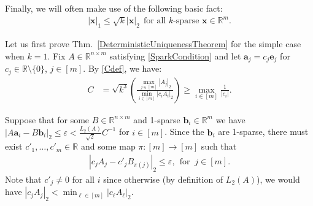 \documentclass[journal, twocolumn]{IEEEtran}
\begin{document}
Finally, we will often make use of the following basic fact:
\begin{align}\label{sqrtk}
|\mathbf{x}|_1 \leq \sqrt{k} |\mathbf{x}|_2 \ \ \text{for all $k$-sparse $\mathbf{x} \in \mathbb{R}^m$}.
\end{align}

Let us first prove Thm.~\ref{DeterministicUniquenessTheorem} for the simple case when $k=1$. Fix $A \in \mathbb{R}^{n \times m}$ satisfying \eqref{SparkCondition} and let $\mathbf{a}_j = c_j \mathbf{e}_j$ for $c_j \in \mathbb{R} \setminus \{0\}$, $j \in [m]$. By \eqref{Cdef}, we have:
\begin{align}\label{C1}
C 
&= \sqrt{k^3} \left( \frac{\max_{j \in [m]} |A_j|_2}{\min_{i \in [m]}|c_iA_i|_2} \right)
\geq \max_{i \in [m]} \frac{1}{|c_i|}.
\end{align}

Suppose that for some $B \in \mathbb{R}^{n \times m}$ and 1-sparse $\mathbf{b}_i \in \mathbb{R}^m$ we have  $|A\mathbf{a}_i - B\mathbf{b}_i|_2 \leq \varepsilon < \frac{L_2(A)}{\sqrt{2}}C^{-1}$ for $i \in [m]$. Since the $\mathbf{b}_i$ are 1-sparse, there must exist $c'_1, \ldots, c'_m \in \mathbb{R}$ and some map $\pi: [m] \to [m]$ such that 
\begin{align}\label{1D}
|c_jA_j - c'_jB_{\pi(j)}|_2 \leq \varepsilon, \ \ \text{for } \  j \in [m].
\end{align} 
Note that $c'_j \neq 0$ for all $i$ since otherwise (by definition of $L_2(A)$), we would have $|c_jA_j|_2 < \min_{\ell \in [m]}|c_{\ell}A_{\ell}|_2$. 
\end{document}
